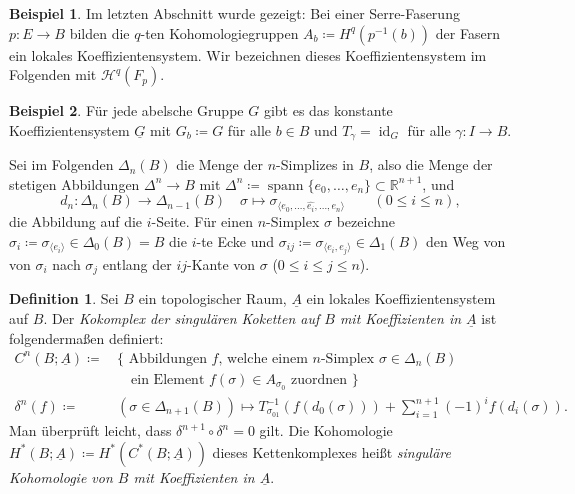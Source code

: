\documentclass[11pt, a4paper, german]{article}
\theoremstyle{definition}
\newtheorem*{bsp}{Beispiel}
\newtheorem*{defn}{Definition}
\theoremstyle{remark}
\newcommand{\R}{\mathbb{R}} %
\DeclareMathOperator{\id}{id} %
\DeclareMathOperator{\spann}{spann} %
\newcommand{\angles}[1]{{\langle #1 \rangle}}
\newcommand{\LH}{\mathcal{H}} %
\begin{document}
\begin{bsp}
  Im letzten Abschnitt wurde gezeigt: Bei einer Serre-Faserung $p : E \to B$ bilden die $q$-ten Kohomologiegruppen $A_b \coloneqq H^q(p^{-1}(b))$ der Fasern ein lokales Koeffizientensystem.
  Wir bezeichnen dieses Koeffizientensystem im Folgenden mit $\LH^q(F_p)$. %
\end{bsp}

\begin{bsp}
  Für jede abelsche Gruppe $G$ gibt es das konstante Koeffizientensystem $\underline{G}$ mit $G_b \coloneqq G$ für alle $b \in B$ und $T_\gamma = \id_G$ für alle $\gamma : I \to B$.
\end{bsp}

Sei im Folgenden $\Delta_n(B)$ die Menge der $n$-Simplizes in $B$, also die Menge der stetigen Abbildungen $\Delta^n \to B$ mit $\Delta^n \coloneqq \spann \{ e_0, \ldots, e_n \} \subset \R^{n+1}$, und
\[
  d_n : \Delta_n(B) \to \Delta_{n-1}(B) \quad
  \sigma \mapsto \sigma_{\angles{e_0, \ldots, \hat{e_i}, \ldots, e_n}} \qquad (0 \leq i \leq n),
\]
die Abbildung auf die $i$-Seite. %
Für einen $n$-Simplex $\sigma$ bezeichne $\sigma_i \coloneqq \sigma_{\angles{e_i}} \in \Delta_0(B) = B$ die $i$-te Ecke und $\sigma_{ij} \coloneqq \sigma_{\angles{e_i, e_j}} \in \Delta_1(B)$ den Weg von von $\sigma_i$ nach $\sigma_j$ entlang der $ij$-Kante von $\sigma$ ($0 \leq i \leq j \leq n$).

\begin{defn}
  Sei $B$ ein topologischer Raum, $\underline{A}$ ein lokales Koeffizientensystem auf $B$.
  Der \emph{Kokomplex der singulären Koketten auf $B$ mit Koeffizienten in $\underline{A}$} ist folgendermaßen definiert:
  \begin{align*}
    C^n(B; \underline{A}) \coloneqq & \, \{ \text{ Abbildungen $f$, welche einem $n$-Simplex $\sigma \in \Delta_n(B)$} \\
    & \enspace\,\, \text{ ein Element $f(\sigma) \in A_{\sigma_0}$ zuordnen } \} \\[2pt]
    \delta^n(f) \coloneqq & \, (\sigma \in \Delta_{n+1}(B)) \mapsto T_{\sigma_{01}}^{-1}(f(d_0(\sigma))) + \sum_{i=1}^{n+1} (-1)^i f(d_i(\sigma)).
  \end{align*}
  Man überprüft leicht, dass $\delta^{n+1} \circ \delta^n = 0$ gilt.
  Die Kohomologie $H^*(B; \underline{A}) \coloneqq H^*(C^*(B; \underline{A}))$ dieses Kettenkomplexes heißt \emph{singuläre Kohomologie von $B$ mit Koeffizienten in $\underline{A}$}.
\end{defn}
\end{document}
